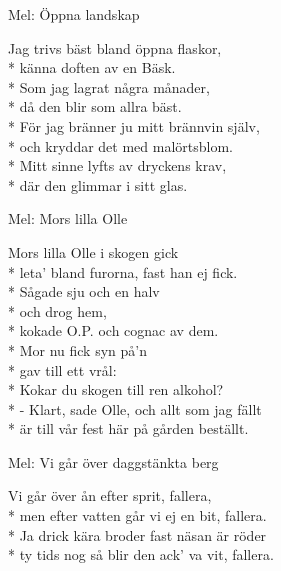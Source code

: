 \begin{SongText}
    \begin{SongInfo}
        Mel: Öppna landskap
    \end{SongInfo}
    \begin{SongVerse}
        Jag trivs bäst bland öppna flaskor,\\*%
        känna doften av en Bäsk.\\*%
        Som jag lagrat några månader,\\*%
        då den blir som allra bäst.\\*%
        För jag bränner ju mitt brännvin själv,\\*%
        och kryddar det med malörtsblom.\\*%
        Mitt sinne lyfts av dryckens krav,\\*%
        där den glimmar i sitt glas.
    \end{SongVerse}
\end{SongText}
\begin{SongText}[Skogskokarvisa]
    \begin{SongInfo}
        Mel: Mors lilla Olle
    \end{SongInfo}
    \begin{SongVerse}
        Mors lilla Olle i skogen gick\\*%
        leta’ bland furorna, fast han ej fick.\\*%
        Sågade sju och en halv\\*%
        och drog hem,\\*%
        kokade O.P. och cognac av dem.\\*%
        Mor nu fick syn på’n\\*%
        gav till ett vrål:\\*%
        Kokar du skogen till ren alkohol?\\*%
        - Klart, sade Olle, och allt som jag fällt\\*%
        är till vår fest här på gården beställt.
    \end{SongVerse}
\end{SongText}
\begin{SongText}
    \begin{SongInfo}
        Mel: Vi går över daggstänkta berg
    \end{SongInfo}
    \begin{SongVerse}
        Vi går över ån efter sprit, fallera,\\*%
        men efter vatten går vi ej en bit, fallera.\\*%
        Ja drick kära broder fast näsan är röder\\*%
        ty tids nog så blir den ack’ va vit, fallera.
    \end{SongVerse}
\end{SongText}
